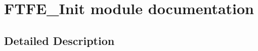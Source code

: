\hypertarget{group___f_t_f_e___init__module}{}\section{F\+T\+F\+E\+\_\+\+Init module documentation}
\label{group___f_t_f_e___init__module}


\subsection{Detailed Description}
